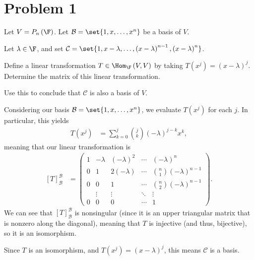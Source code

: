 \documentclass[12pt]{mypackage}
\begin{document}
\section{Problem 1}%
\begin{problem}
  Let $V = P_{n}\left(\F\right)$. Let $\mathcal{B} = \set{1,x,\dots,x^n}$ be a basis of $V$.\newline

  Let $\lambda \in \F$, and set $\mathcal{C} = \set{1,x-\lambda,\dots,\left(x-\lambda\right)^{n-1},\left(x-\lambda\right)^n}$.\newline

  Define a linear transformation $T\in \Hom_{\F}\left(V,V\right)$ by taking $T\left(x^j\right) = \left(x-\lambda\right)^j$. Determine the matrix of this linear transformation.\newline

  Use this to conclude that $\mathcal{C}$ is also a basis of $V$.
\end{problem}
\begin{solution}
  Considering our basis $\mathcal{B} = \set{1,x,\dots,x^n}$, we evaluate $T\left(x^j\right)$ for each $j$. In particular, this yields
  \begin{align*}
    T\left(x^j\right) &= \sum_{k=0}^{j}{j\choose k}\left(-\lambda\right)^{j-k}x^k,
  \end{align*}
  meaning that our linear transformation is
  \begin{align*}
    \left[T\right]_{\mathcal{B}}^{\mathcal{B}} &= \begin{pmatrix}1 & -\lambda & \left(-\lambda\right)^2 & \cdots & \left(-\lambda\right)^{n}\\ 0 & 1 & 2\left(-\lambda\right) & \cdots & {n\choose 1}\left(-\lambda\right)^{n-1}\\ 0 & 0 & 1 & \cdots & {n\choose 2}\left(-\lambda\right)^{n-1} \\ &\vdots & \vdots & \ddots & \vdots \\ 0 & 0 & 0 & \cdots & 1\end{pmatrix}.
  \end{align*}
  We can see that $\left[T\right]_{\mathcal{B}}^{\mathcal{B}}$ is nonsingular (since it is an upper triangular matrix that is nonzero along the diagonal), meaning that $T$ is injective (and thus, bijective), so it is an isomorphism.\newline

  Since $T$ is an isomorphism, and $T\left(x^j\right) = \left(x-\lambda\right)^j$, this means $\mathcal{C}$ is a basis.
\end{solution}
\end{document}
